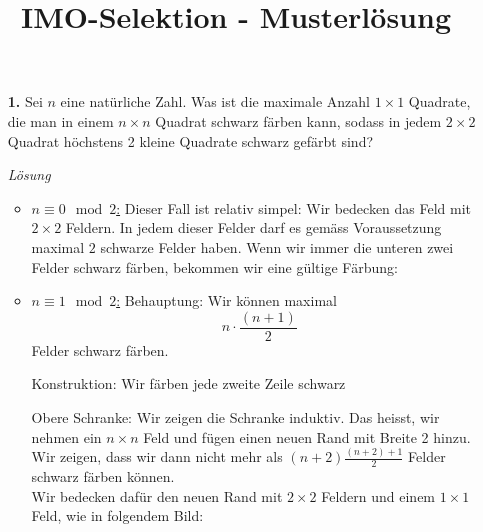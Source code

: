 \documentclass[language=german,style=solution]{smo}
\title{IMO-Selektion - Musterlösung}
\begin{document}
\begin{enumerate}

\item[\textbf{1.}] %
Sei $n$ eine natürliche Zahl. Was ist die maximale Anzahl $1\times 1$ Quadrate, die man in einem $n\times n$ Quadrat schwarz färben kann, sodass in jedem $2\times 2$ Quadrat höchstens 2 kleine Quadrate schwarz gefärbt sind?

\textit{Lösung}

\begin{itemize}
\item \underline{$n \equiv 0 \mod{2}$:} Dieser Fall ist relativ simpel: Wir bedecken das Feld mit $2\times 2$ Feldern. In jedem dieser Felder darf es gemäss Voraussetzung maximal $2$ schwarze Felder haben. Wenn wir immer die unteren zwei Felder schwarz färben, bekommen wir eine gültige Färbung:

\item \underline{$n \equiv 1 \mod{2}$:} Behauptung: Wir können maximal
\[
n\cdot \frac{(n+1)}{2}
\]
Felder schwarz färben.

Konstruktion: Wir färben jede zweite Zeile schwarz


Obere Schranke: Wir zeigen die Schranke induktiv. Das heisst, wir nehmen ein $n \times n$ Feld und fügen einen neuen Rand mit Breite 2 hinzu. Wir zeigen, dass wir dann nicht mehr als $(n+2) \frac{(n+2)+1}{2}$ Felder schwarz färben können.\\
Wir bedecken dafür den neuen Rand mit $2 \times 2$ Feldern und einem $1 \times 1$ Feld, wie in folgendem Bild:


\end{itemize}
\end{enumerate}
\end{document}
